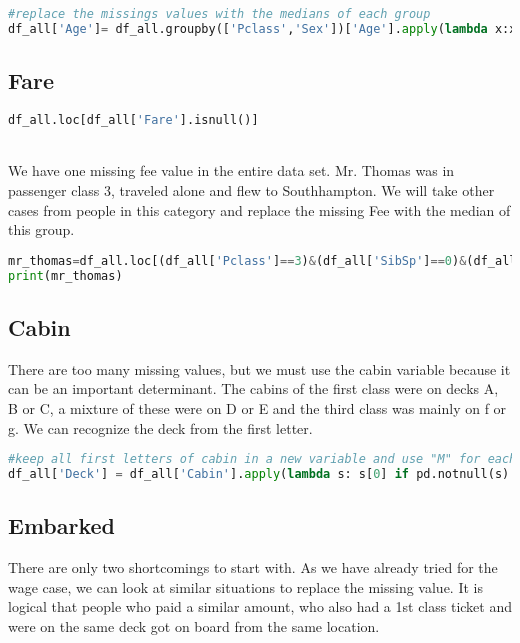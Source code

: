 \documentclass[onecolumn]{article}
\begin{document}
\begin{lstlisting}[language=Python, caption=  age ] 
#replace the missings values with the medians of each group
df_all['Age']= df_all.groupby(['Pclass','Sex'])['Age'].apply(lambda x:x.fillna(x.median()))
\end{lstlisting}

\subsection{Fare}
\begin{lstlisting}[language=Python, caption=  fare ] 
df_all.loc[df_all['Fare'].isnull()]   
\end{lstlisting}
\\

We have one missing fee value in the entire data set. Mr. Thomas was in passenger class 3, traveled alone and flew to Southhampton. We will take other cases from people in this category and replace the missing Fee with the median of this group.

\begin{lstlisting}[language=Python, caption=  loc cases which are similar to Mr.Thomas and use the median of fare to replace  the missing for his data set ] 
mr_thomas=df_all.loc[(df_all['Pclass']==3)&(df_all['SibSp']==0)&(df_all['Embarked']=='S')]['Fare'].median()
print(mr_thomas)
\end{lstlisting}
\subsection{Cabin}

There are too many missing values, but we must use the cabin variable because it can be an important determinant. The cabins of the first class were on decks A, B or C, a mixture of these were on D or E and the third class was mainly on f or g. We can recognize the deck from the first letter.


\begin{lstlisting}[language=Python, caption=  cabin missing values] 
#keep all first letters of cabin in a new variable and use "M" for each missing
df_all['Deck'] = df_all['Cabin'].apply(lambda s: s[0] if pd.notnull(s) else 'M' )
\end{lstlisting}
\subsection{Embarked}

There are only two shortcomings to start with. As we have already tried for the wage case, we can look at similar situations to replace the missing value. It is logical that people who paid a similar amount, who also had a 1st class ticket and were on the same deck got on board from the same location.
\end{document}
